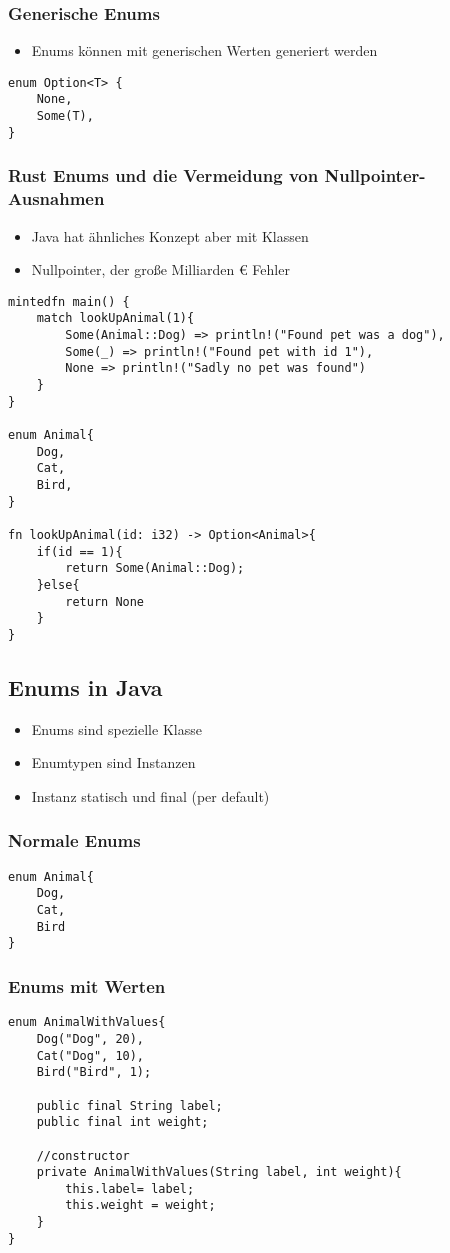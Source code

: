 \documentclass[a4paper, 1ppt]{article}
\begin{document}
\subsubsection{Generische Enums}
\begin{itemize}
	\item Enums können mit generischen Werten generiert werden
\end{itemize}
\begin{verbatim}
enum Option<T> {
	None,
	Some(T),
}
\end{verbatim}
\subsubsection{Rust Enums und die Vermeidung von Nullpointer-Ausnahmen}
\begin{itemize}
	\item Java hat ähnliches Konzept aber mit Klassen
	\item Nullpointer, der große Milliarden € Fehler
\end{itemize}
\begin{verbatim}
mintedfn main() {
    match lookUpAnimal(1){
        Some(Animal::Dog) => println!("Found pet was a dog"),
        Some(_) => println!("Found pet with id 1"),
        None => println!("Sadly no pet was found")
    }
}

enum Animal{
    Dog,
    Cat,
    Bird,
}

fn lookUpAnimal(id: i32) -> Option<Animal>{
    if(id == 1){
        return Some(Animal::Dog);
    }else{
        return None
    }
}
\end{verbatim}
\subsection{Enums in Java}
\begin{itemize}
	\item Enums sind spezielle Klasse
	\item Enumtypen sind Instanzen
	\item Instanz statisch und final (per default)
\end{itemize}
\subsubsection{Normale Enums}
\begin{verbatim}
enum Animal{
    Dog,
    Cat,
    Bird
}
\end{verbatim}
\subsubsection{Enums mit Werten}
\begin{verbatim}
enum AnimalWithValues{
    Dog("Dog", 20),
    Cat("Dog", 10),
    Bird("Bird", 1);

    public final String label;
    public final int weight;

    //constructor
    private AnimalWithValues(String label, int weight){
        this.label= label;
        this.weight = weight;
    }
}
\end{verbatim}
\end{document}
